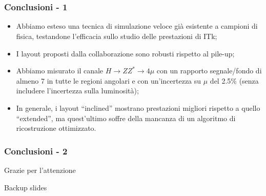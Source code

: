 \documentclass{beamer}
\begin{document}
\section{}
\begin{frame}
\frametitle{Conclusioni - 1}
\begin{itemize}
\item<1-> Abbiamo esteso una tecnica di simulazione veloce gi\`a esistente
a campioni di fisica, testandone l'efficacia sullo studio delle prestazioni di ITk;
\item<2-> I layout proposti dalla collaborazione sono robusti rispetto al pile-up;
\item<3-> Abbiamo misurato il canale $H \rightarrow ZZ^{*} \rightarrow 4\mu$ con
un rapporto segnale/fondo di almeno 7 in tutte le regioni angolari e con un'incertezza
su $\mu$ del 2.5\% (senza includere l'incertezza sulla luminosit\`a);
\item<4-> In generale, i layout ``inclined'' mostrano prestazioni migliori rispetto a quello
``extended'', ma quest'ultimo soffre della mancanza di un algoritmo di ricostruzione ottimizzato.
\end{itemize}
\end{frame}

\begin{frame}[label=Conclusions]
\frametitle{Conclusioni - 2}

\bigskip
\bigskip
\bigskip
{} {
\centering
\Large \color{dred} Grazie per l'attenzione
}

\end{frame}

\begin{frame}
\begin{center}
\huge{\color{dred}Backup slides}
\end{center}
\end{frame}
\end{document}
